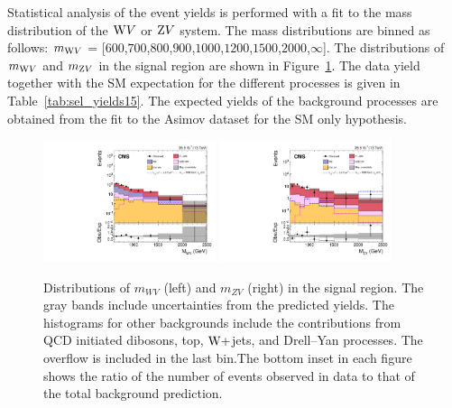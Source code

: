 Statistical analysis of the event yields is performed with a fit to the mass distribution of the $\mathrm{W} V$ or $\mathrm{Z} V$ system. The mass distributions are binned as follows: $m_{\mathrm{W} V}$ = [$600$,$700$,$800$,$900$,$1000$,$1200$,$1500$,$2000$,$\infty$]. The distributions of $m_{\mathrm{W} V}$ and $m_{\mathrm{Z} V}$ in the signal region are shown in Figure~\ref{fig:signal2}. The data yield together with the SM expectation for the different processes is given in Table~\ref{tab:sel_yields15}. The expected yields of the background processes are obtained from the fit to the Asimov dataset for the SM only hypothesis. 


\begin{figure}[!htbp]
\centering
\includegraphics[width=0.45\textwidth]{Plots/plots/wv_signal.pdf}
\includegraphics[width=0.45\textwidth]{Plots/plots/zv_signal.pdf}
\caption{Distributions of $m_{WV}$ (left) and $m_{ZV}$ (right) in the signal region. The gray bands include uncertainties from the predicted yields. The histograms for other backgrounds include the contributions from QCD initiated dibosons, top, $\mathrm{W}+$jets, and Drell--Yan processes. The overflow is included in the last bin.The bottom inset in each figure shows the ratio of the number of events observed in data to that of the total background prediction.}
\label{fig:signal2}
\end{figure}

